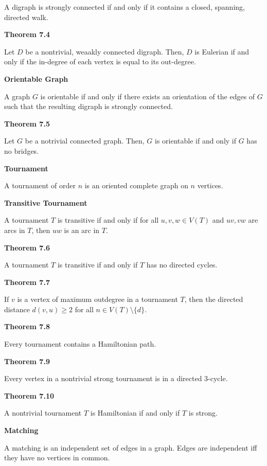 \documentclass{article}
\begin{document}
    A digraph is strongly connected if and only if it contains a closed, spanning, directed walk.

\medskip\noindent\textbf{Theorem 7.4}

    Let $D$ be a nontrivial, weaakly connected digraph.
    Then, $D$ is Eulerian if and only if the in-degree of each vertex is equal to its out-degree.

\medskip\noindent\textbf{Orientable Graph}

	A graph $G$ is orientable if and only if there exists an orientation of the edges of $G$ such that the resulting digraph is strongly connected.

\medskip\noindent\textbf{Theorem 7.5}

	Let $G$ be a notrivial connected graph.
	Then, $G$ is orientable if and only if $G$ has no bridges.

\medskip\noindent\textbf{Tournament}

	A tournament of order $n$ is an oriented complete graph on $n$ vertices.

\medskip\noindent\textbf{Transitive Tournament}

	A tournament $T$ is transitive if and only if for all $u,v,w \in V(T)$ and $uv,vw$ are arcs in $T$, then $uw$ is an arc in $T$.

\medskip\noindent\textbf{Theorem 7.6}

	A tournament $T$ is transitive if and only if $T$ has no directed cycles.

\medskip\noindent\textbf{Theorem 7.7}

	If $v$ is a vertex of maximum outdegree in a tournament $T$, then the directed distance $d(v, u) \geq 2$ for all $n \in V(T) \setminus \{d\}$.

\medskip\noindent\textbf{Theorem 7.8}

	Every tournament contains a Hamiltonian path.

\medskip\noindent\textbf{Theorem 7.9}

	Every vertex in a nontrivial strong tournament is in a directed 3-cycle.

\medskip\noindent\textbf{Theorem 7.10}

	A nontrivial tournament $T$ is Hamiltonian if and only if $T$ is strong.

\medskip\noindent\textbf{Matching}

	A matching is an independent set of edges in a graph.
    Edges are independent iff they have no vertices in common.
\end{document}
